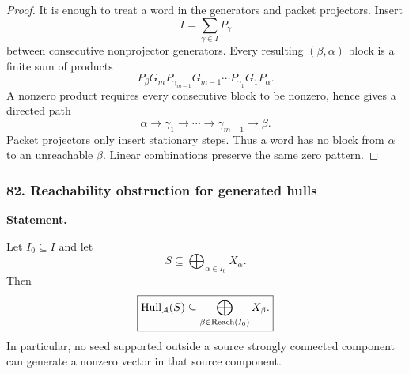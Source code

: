 \begin{proof}
It is enough to treat a word in the generators and packet projectors.  Insert
\[
I=\sum_{\gamma\in I}P_\gamma
\]
between consecutive nonprojector generators.  Every resulting $(\beta,\alpha)$ block is a finite sum of products
\[
P_\beta G_mP_{\gamma_{m-1}}
G_{m-1}\cdots
P_{\gamma_1}G_1P_\alpha.
\]
A nonzero product requires every consecutive block to be nonzero, hence gives a directed path
\[
\alpha\to\gamma_1\to\cdots\to\gamma_{m-1}\to\beta.
\]
Packet projectors only insert stationary steps.  Thus a word has no block from $\alpha$ to an unreachable $\beta$.  Linear combinations preserve the same zero pattern.
\end{proof}
\subsubsection*{82. Reachability obstruction for generated hulls}
\label{rec:PSC-I-P-REACHABILITY-OBSTRUCTION}
\textbf{Statement.}\par
Let $I_0\subseteq I$ and let
\[
S\subseteq\bigoplus_{\alpha\in I_0}X_\alpha.
\]
Then
\[
\boxed{
\operatorname{Hull}_{\mathcal A}(S)
\subseteq
\bigoplus_{\beta\in\operatorname{Reach}(I_0)}X_\beta.
}
\]
In particular, no seed supported outside a source strongly connected component can generate a nonzero vector in that source component.

